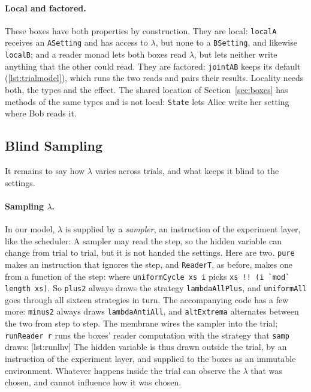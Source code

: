 \documentclass[11pt]{article}
\newcommand{\hs}{\lstinline[style=hask,basicstyle=\ttfamily,frame=none]}
\begin{document}
\paragraph{Local and factored.} These boxes have both properties by construction. They are local: \hs|localA| receives an \hs|ASetting| and has access to $\lambda$, but none to a \hs|BSetting|, and likewise \hs|localB|; and a reader monad lets both boxes read $\lambda$, but lets neither write anything that the other could read. They are factored: \hs|jointAB| keeps its default (\ref{lst:trialmodel}), which runs the two reads and pairs their results. Locality needs both, the types and the effect. The shared location of Section~\ref{sec:boxes} has methods of the same types and is not local: \hs|State| lets Alice write her setting where Bob reads it.

\subsection{Blind Sampling}\label{sec:staging}

It remains to say how $\lambda$ varies across trials, and what keeps it blind to the settings.

\paragraph{Sampling $\lambda$.} In our model, $\lambda$ is supplied by a \emph{sampler}, an instruction of the experiment layer, like the scheduler:
A sampler may read the step, so the hidden variable can change from trial to trial, but it is not handed the settings. Here are two. \hs|pure| makes an instruction that ignores the step, and \hs|ReaderT|, as before, makes one from a function of the step:
\noindent where \hs|uniformCycle xs i| picks \hs|xs !! (i `mod` length xs)|. So \hs|plus2| always draws the strategy \hs|lambdaAllPlus|, and \hs|uniformAll| goes through all sixteen strategies in turn. The accompanying code has a few more: \hs|minus2| always draws \hs|lambdaAntiAll|, and \hs|altExtrema| alternates between the two from step to step. The membrane wires the sampler into the trial; \hs|runReader r| runs the boxes' reader computation with the strategy that \hs|samp| draws:
[lst:runlhv]
The hidden variable is thus drawn outside the trial, by an instruction of the experiment layer, and supplied to the boxes as an immutable environment. Whatever happens inside the trial can observe the $\lambda$ that was chosen, and cannot influence how it was chosen.
\end{document}
